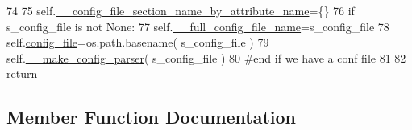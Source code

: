 \begin{DoxyCode}
74 
75         self.\hyperlink{classnegui_1_1pginputsimupop_1_1PGInputSimuPop_acd9740f17e53a6e471d4e85565962369}{\_\_config\_file\_section\_name\_by\_attribute\_name}=\{\}
76         \textcolor{keywordflow}{if} s\_config\_file \textcolor{keywordflow}{is} \textcolor{keywordflow}{not} \textcolor{keywordtype}{None}:
77             self.\hyperlink{classnegui_1_1pginputsimupop_1_1PGInputSimuPop_ad7c3feef55c16989a35f56c3e0d9943e}{\_\_full\_config\_file\_name}=s\_config\_file
78             self.\hyperlink{classnegui_1_1pginputsimupop_1_1PGInputSimuPop_af82bde7e564aee524fc30f2e06fde934}{config\_file}=os.path.basename( s\_config\_file )
79             self.\hyperlink{classnegui_1_1pginputsimupop_1_1PGInputSimuPop_a0b34c99730e86de268c5503ed226d15e}{\_\_make\_config\_parser}( s\_config\_file )
80         \textcolor{comment}{#end if we have a conf file}
81     
82         \textcolor{keywordflow}{return}
\end{DoxyCode}


\subsection{Member Function Documentation}

